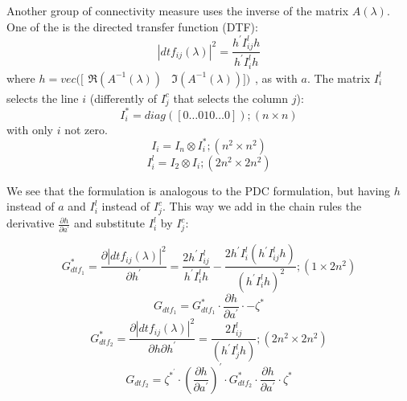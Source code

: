 \documentclass[a4paper,10pt]{article}
\begin{document}
Another group of connectivity measure uses the inverse of the matrix $A(\lambda)$. One of the is the directed transfer function (DTF):
\begin{equation}
 |dtf_{ij}(\lambda)|^{2} = \frac{h^{'} I_{ij}^{l} h}{h^{'} I_{i}^{l} h}
\end{equation}
where $h = vec([\begin{array}{cc}\Re(A^{-1}(\lambda)) & \Im(A^{-1}(\lambda))])\end{array}$, as with $a$. The matrix $I_{i}^{l}$ selects the line $i$ (differently of $I_{j}^{c}$ that selects the column $j$):
\begin{equation}
I_{i}^{\ast} = diag([0 \dots 0 1 0 \dots 0]); (n \times n)
\end{equation}
with only $i$ not zero.
\begin{equation}
I_{i} = I_{n} \otimes I_{i}^{\ast}; (n^{2} \times n^{2})
\end{equation}
\begin{equation}
I_{i}^{l} = I_{2} \otimes I_{i}; (2n^{2} \times 2n^{2})
\end{equation}

We see that the formulation is analogous to the PDC formulation, but having $h$ instead of $a$ and $I_{i}^{l}$ instead of $I_{j}^{c}$. This way we add in the chain rules the derivative $\frac{\partial h}{\partial a^{'}}$ and substitute $I_{i}^{l}$ by $I_{j}^{c}$:

\begin{equation}
G_{dtf_{1}}^{\ast} = \frac{\partial |dtf_{ij}(\lambda)|^{2}} {\partial h^{'}} = \frac{2 h^{'} I_{ij}^{l}} {h^{'} I_{i}^{l} h} - \frac{2 h^{'} I_{i}^{l} (h^{'} I_{ij}^{l} h)} {(h^{'} I_{i}^{l} h)^{2}}; (1 \times 2n^{2})
\end{equation}
\begin{equation}
G_{dtf_{1}} = G_{dtf_{1}}^{\ast} \cdot \frac{\partial h}{\partial a^{'}} \cdot -\zeta^{\ast} 
\end{equation}
\begin{equation}
G_{dtf_{2}}^{\ast} = \frac{\partial |dtf_{ij}(\lambda)|^{2}} {\partial h \partial h^{'}} = \frac{2 I_{ij}^{l}}{(h^{'} I_{j}^{l} h)}; (2n^{2} \times 2n^{2})
\end{equation}
\begin{equation}
G_{dtf_{2}} = \zeta^{\ast^{'}} \cdot (\frac{\partial h}{\partial a^{'}})^{'} \cdot G_{dtf_{2}}^{\ast} \cdot \frac{\partial h}{\partial a^{'}} \cdot \zeta^{\ast}
\end{equation}
\end{document}
